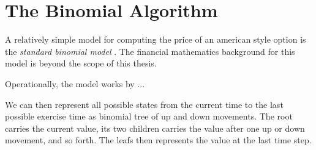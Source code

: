 \section{The Binomial Algorithm}

A relatively simple model for computing the price of an american style option
is the \emph{standard binomial model} . The financial mathematics background for this model is beyond the
scope of this thesis.

Operationally, the model works by ...


We can then represent all possible states from the current time to the
last possible exercise time as binomial tree of up and down
movements. The root carries the current value, its two children
carries the value after one up or down movement, and so forth. The
leafs then represents the value at the last time step.
